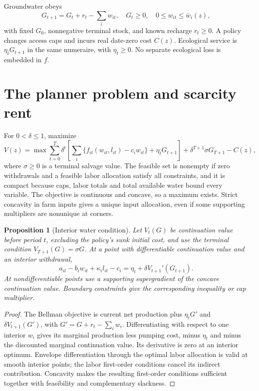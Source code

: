 \documentclass[11pt]{article}
\newtheorem{proposition}{Proposition}
\begin{document}
Groundwater obeys
\[
 G_{t+1}=G_t+r_t-\sum_iw_{it},\quad G_t\geq0,\quad
 0\leq w_{it}\leq\bar w_i(z),
\]
with fixed $G_0$, nonnegative terminal stock, and known recharge $r_t\geq0$. A policy changes access caps and incurs real date-zero cost $C(z)$. Ecological service is $\eta_t G_{t+1}$ in the same numeraire, with $\eta_t\geq0$. No separate ecological loss is embedded in $f$.

\section*{The planner problem and scarcity rent}
For $0<\delta\leq1$, maximize
\[
 V(z)=\max\sum_{t=0}^T\delta^t
 \left[\sum_i\{f_{it}(w_{it},l_{it})-c_iw_{it}\}+\eta_tG_{t+1}\right]
 +\delta^{T+1}\sigma G_{T+1}-C(z),
\]
where $\sigma\geq0$ is a terminal salvage value. The feasible set is nonempty if zero withdrawals and a feasible labor allocation satisfy all constraints, and it is compact because caps, labor totals and total available water bound every variable. The objective is continuous and concave, so a maximum exists. Strict concavity in farm inputs gives a unique input allocation, even if some supporting multipliers are nonunique at corners.

\begin{proposition}[Interior water condition]
Let $V_t(G)$ be continuation value before period $t$, excluding the policy's sunk initial cost, and use the terminal condition $V_{T+1}(G)=\sigma G$. At a point with differentiable continuation value and an interior withdrawal,
\[
 a_{it}-b_iw_{it}+\kappa_i l_{it}-c_i
 =\eta_t+\delta V_{t+1}'(G_{t+1}).
\]
At nondifferentiable points use a supporting supergradient of the concave continuation value. Boundary constraints give the corresponding inequality or cap multiplier.
\end{proposition}
\begin{proof}
The Bellman objective is current net production plus $\eta_tG'$ and $\delta V_{t+1}(G')$, with $G'=G+r_t-\sum_iw_i$. Differentiating with respect to one interior $w_i$ gives its marginal production less pumping cost, minus $\eta_t$ and minus the discounted marginal continuation value. Its derivative is zero at an interior optimum. Envelope differentiation through the optimal labor allocation is valid at smooth interior points; the labor first-order conditions cancel its indirect contribution. Concavity makes the resulting first-order conditions sufficient together with feasibility and complementary slackness.
\end{proof}
\end{document}
